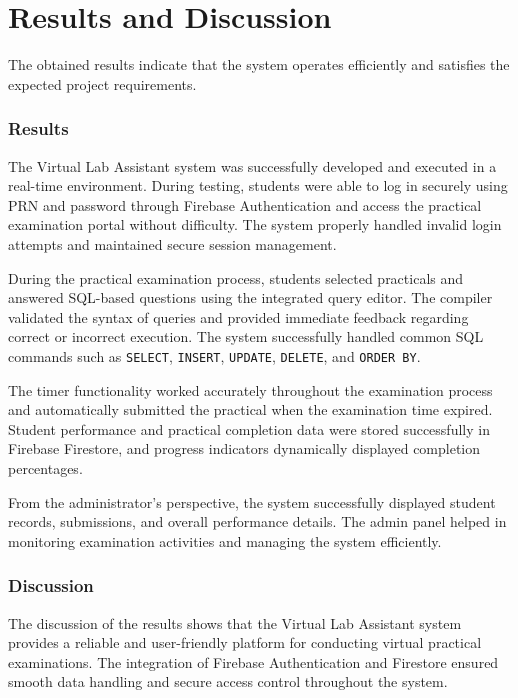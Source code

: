 \documentclass{SSBT-BE}
\begin{document}
\chapter{Results and Discussion}

The obtained results indicate that the system operates efficiently and satisfies the expected project requirements. 
\subsection*{Results}

The Virtual Lab Assistant system was successfully developed and executed in a real-time environment. During testing, students were able to log in securely using PRN and password through Firebase Authentication and access the practical examination portal without difficulty. The system properly handled invalid login attempts and maintained secure session management.

During the practical examination process, students selected practicals and answered SQL-based questions using the integrated query editor. The compiler validated the syntax of queries and provided immediate feedback regarding correct or incorrect execution. The system successfully handled common SQL commands such as \texttt{SELECT}, \texttt{INSERT}, \texttt{UPDATE}, \texttt{DELETE}, and \texttt{ORDER BY}. 

The timer functionality worked accurately throughout the examination process and automatically submitted the practical when the examination time expired. Student performance and practical completion data were stored successfully in Firebase Firestore, and progress indicators dynamically displayed completion percentages.

From the administrator’s perspective, the system successfully displayed student records, submissions, and overall performance details. The admin panel helped in monitoring examination activities and managing the system efficiently.

\subsection*{Discussion}

The discussion of the results shows that the Virtual Lab Assistant system provides a reliable and user-friendly platform for conducting virtual practical examinations. The integration of Firebase Authentication and Firestore ensured smooth data handling and secure access control throughout the system.
\end{document}
